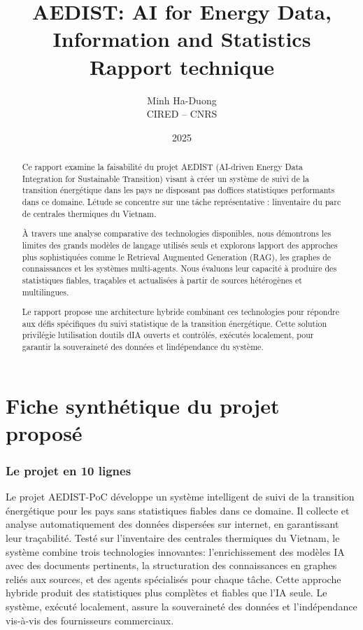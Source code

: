 \documentclass[a4paper,11pt]{report}
\title{AEDIST: AI for Energy Data, Information and Statistics\\
\large Rapport technique}
\author{Minh Ha-Duong\\CIRED -- CNRS}
\date{2025}
\begin{document}
\maketitle
\tableofcontents

\begin{abstract}
Ce rapport examine la faisabilité du projet AEDIST (AI-driven Energy Data Integration for Sustainable Transition) visant à créer un système de suivi de la transition énergétique dans les pays ne disposant pas d\textquotesingle offices statistiques performants dans ce domaine. L\textquotesingle étude se concentre sur une tâche représentative : l\textquotesingle inventaire du parc de centrales thermiques du Vietnam.

À travers une analyse comparative des technologies disponibles, nous démontrons les limites des grands modèles de langage utilisés seuls et explorons l\textquotesingle apport des approches plus sophistiquées comme le Retrieval Augmented Generation (RAG), les graphes de connaissances et les systèmes multi-agents. Nous évaluons leur capacité à produire des statistiques fiables, traçables et actualisées à partir de sources hétérogènes et multilingues.

Le rapport propose une architecture hybride combinant ces technologies pour répondre aux défis spécifiques du suivi statistique de la transition énergétique. Cette solution privilégie l\textquotesingle utilisation d\textquotesingle outils d\textquotesingle IA ouverts et contrôlés, exécutés localement, pour garantir la souveraineté des données et l\textquotesingle indépendance du système.
\end{abstract}

\newpage

\chapter{Fiche synthétique du projet proposé}\label{fiche-synthuxe9tique-du-projet-proposuxe9}

\subsection{Le projet en 10 lignes}\label{le-projet-en-10-lignes}

Le projet AEDIST-PoC développe un système intelligent de suivi de la transition énergétique pour les pays sans statistiques fiables dans ce domaine. Il collecte et analyse automatiquement des données dispersées sur internet, en garantissant leur traçabilité. Testé sur l'inventaire des centrales thermiques du Vietnam, le système combine trois technologies innovantes: l'enrichissement des modèles IA avec des documents pertinents, la structuration des connaissances en graphes reliés aux sources, et des agents spécialisés pour chaque tâche. Cette approche hybride produit des statistiques plus complètes et fiables que l'IA seule. Le système, exécuté localement, assure la souveraineté des données et l'indépendance vis-à-vis des fournisseurs commerciaux.
\end{document}
